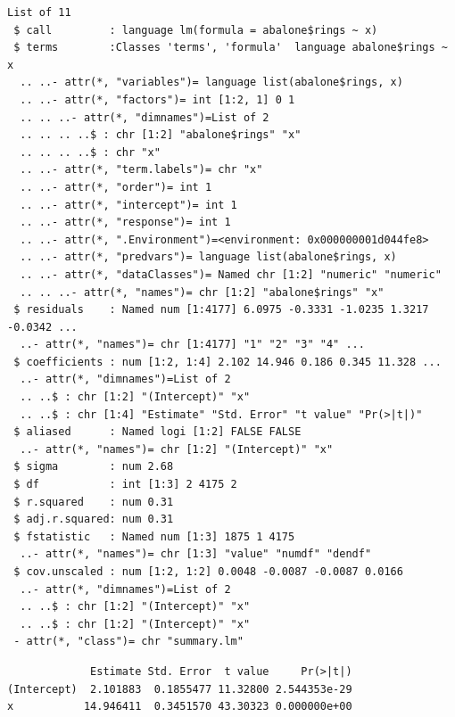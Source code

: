 \documentclass[
  11pt,
]{krantz}
\newenvironment{Shaded}{\begin{snugshade}}{\end{snugshade}}
\newcommand{\CommentTok}[1]{\textcolor[rgb]{0.37,0.37,0.37}{\textit{#1}}}
\newcommand{\ControlFlowTok}[1]{\textcolor[rgb]{0.27,0.27,0.27}{\textbf{#1}}}
\newcommand{\DecValTok}[1]{\textcolor[rgb]{0.06,0.06,0.06}{#1}}
\newcommand{\KeywordTok}[1]{\textcolor[rgb]{0.27,0.27,0.27}{\textbf{#1}}}
\newcommand{\NormalTok}[1]{#1}
\newcommand{\OperatorTok}[1]{\textcolor[rgb]{0.43,0.43,0.43}{\textbf{#1}}}
\newcommand{\StringTok}[1]{\textcolor[rgb]{0.5,0.5,0.5}{#1}}
\begin{document}
\begin{verbatim}
List of 11
 $ call         : language lm(formula = abalone$rings ~ x)
 $ terms        :Classes 'terms', 'formula'  language abalone$rings ~ x
  .. ..- attr(*, "variables")= language list(abalone$rings, x)
  .. ..- attr(*, "factors")= int [1:2, 1] 0 1
  .. .. ..- attr(*, "dimnames")=List of 2
  .. .. .. ..$ : chr [1:2] "abalone$rings" "x"
  .. .. .. ..$ : chr "x"
  .. ..- attr(*, "term.labels")= chr "x"
  .. ..- attr(*, "order")= int 1
  .. ..- attr(*, "intercept")= int 1
  .. ..- attr(*, "response")= int 1
  .. ..- attr(*, ".Environment")=<environment: 0x000000001d044fe8> 
  .. ..- attr(*, "predvars")= language list(abalone$rings, x)
  .. ..- attr(*, "dataClasses")= Named chr [1:2] "numeric" "numeric"
  .. .. ..- attr(*, "names")= chr [1:2] "abalone$rings" "x"
 $ residuals    : Named num [1:4177] 6.0975 -0.3331 -1.0235 1.3217 -0.0342 ...
  ..- attr(*, "names")= chr [1:4177] "1" "2" "3" "4" ...
 $ coefficients : num [1:2, 1:4] 2.102 14.946 0.186 0.345 11.328 ...
  ..- attr(*, "dimnames")=List of 2
  .. ..$ : chr [1:2] "(Intercept)" "x"
  .. ..$ : chr [1:4] "Estimate" "Std. Error" "t value" "Pr(>|t|)"
 $ aliased      : Named logi [1:2] FALSE FALSE
  ..- attr(*, "names")= chr [1:2] "(Intercept)" "x"
 $ sigma        : num 2.68
 $ df           : int [1:3] 2 4175 2
 $ r.squared    : num 0.31
 $ adj.r.squared: num 0.31
 $ fstatistic   : Named num [1:3] 1875 1 4175
  ..- attr(*, "names")= chr [1:3] "value" "numdf" "dendf"
 $ cov.unscaled : num [1:2, 1:2] 0.0048 -0.0087 -0.0087 0.0166
  ..- attr(*, "dimnames")=List of 2
  .. ..$ : chr [1:2] "(Intercept)" "x"
  .. ..$ : chr [1:2] "(Intercept)" "x"
 - attr(*, "class")= chr "summary.lm"
\end{verbatim}

\begin{Shaded}
\end{Shaded}

\begin{verbatim}
             Estimate Std. Error  t value     Pr(>|t|)
(Intercept)  2.101883  0.1855477 11.32800 2.544353e-29
x           14.946411  0.3451570 43.30323 0.000000e+00
\end{verbatim}

\begin{Shaded}
\end{Shaded}
\end{document}
